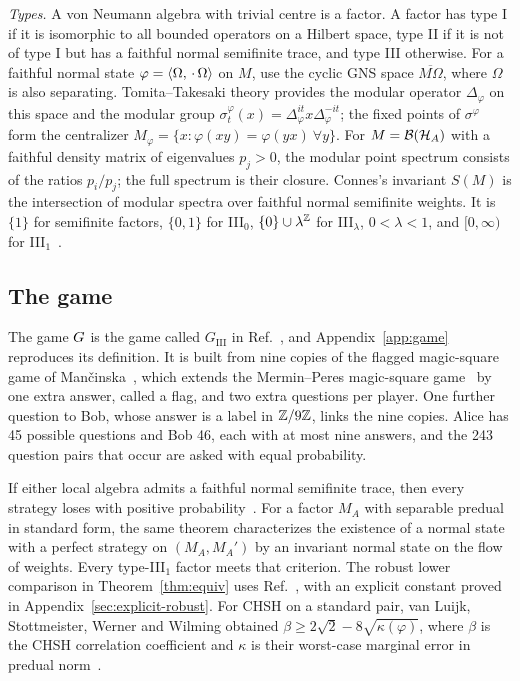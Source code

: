 \emph{Types.} A von Neumann algebra with trivial centre is a factor. A factor has type I if it
is isomorphic to all bounded operators on a Hilbert space, type II if it is not of type I but
has a faithful normal semifinite trace, and type III otherwise. For a faithful normal state
$\varphi=\langle \Omega,\,\cdot\,\Omega\rangle$ on $M$, use the cyclic GNS space $\overline{M\Omega}$,
where $\Omega$ is also separating. Tomita--Takesaki theory provides the modular operator
$\Delta_\varphi$ on this space and the modular group
$\sigma_t^\varphi(x)=\Delta_\varphi^{it}x\Delta_\varphi^{-it}$; the fixed points of
$\sigma^\varphi$ form the centralizer $M_\varphi=\{x:\varphi(xy)=\varphi(yx)\ \forall y\}$. For $M=\mathcal{B}(\mathcal{H}_A)$ with a faithful density matrix of eigenvalues
$p_j>0$, the modular point spectrum consists of the ratios $p_i/p_j$; the
full spectrum is their closure. Connes's invariant $S(M)$ is the intersection
of modular spectra over faithful normal semifinite weights. It is $\{1\}$
for semifinite factors, $\{0,1\}$ for III$_0$,
$\{0\}\cup\lambda^{\mathbb{Z}}$ for III$_\lambda$, $0<\lambda<1$, and
$[0,\infty)$ for III$_1$~\cite{Connes73,TakesakiII}.

\subsection{The game}\label{sec:game}

The game $G$ is the game called $G_{\mathrm{III}}$ in Ref.~\cite{TG}, and
Appendix~\ref{app:game} reproduces its definition. It is built from nine copies of the flagged
magic-square game of Man\v{c}inska~\cite{Mancinska26}, which extends the Mermin--Peres
magic-square game~\cite{Mermin90,Peres90} by one extra answer, called a flag, and two extra
questions per player. One further question to Bob, whose answer is a label in $\mathbb{Z}/9\mathbb{Z}$, links
the nine copies. Alice has 45 possible questions and Bob 46, each with at most nine answers,
and the 243 question pairs that occur are asked with equal probability.

If either local algebra admits a faithful normal semifinite trace, then every strategy
loses with positive probability~\cite[Theorem~1.1]{TG}. For a factor $M_A$ with separable
predual in standard form, the same theorem characterizes the existence of a normal state
with a perfect strategy on $(M_A,M_A')$ by an invariant normal state on the flow of weights.
Every type-III$_1$ factor meets that criterion. The robust lower comparison in
Theorem~\ref{thm:equiv} uses Ref.~\cite[Theorem~1.4]{TG}, with an explicit constant proved in
Appendix~\ref{sec:explicit-robust}.
For CHSH on a standard pair, van Luijk, Stottmeister, Werner and Wilming obtained
$\beta\ge 2\sqrt{2}-8\sqrt{\kappa(\varphi)}$, where $\beta$ is the CHSH correlation
coefficient and $\kappa$ is their worst-case marginal error in predual
norm~\cite[Theorem~J and Proposition~100]{vLSWW24}.

